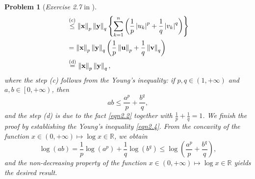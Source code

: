 \documentclass[11pt]{article}
\newtheorem{problem}{Problem}
\begin{document}
\begin{problem} [\emph{Exercise 2.7} in \cite{calafiore2014optimization}]
{\begin{equation}
\begin{split}
        &\stackrel{\textnormal{(c)}}{\leq} \left\| \mathbf{x} \right\|_p \left\| \mathbf{y} \right\|_q \left\{ \sum_{k=1}^{n} \left( \frac{1}{p} \left| u_k \right|^p + \frac{1}{q} \left| v_k \right|^q \right) \right\} \\
        &= \left\| \mathbf{x} \right\|_p \left\| \mathbf{y} \right\|_q \left( \frac{1}{p} \left\| \mathbf{u} \right\|_p + \frac{1}{q} \left\| \mathbf{v} \right\|_q \right) \\
        &\stackrel{\textnormal{(d)}}{=} \left\| \mathbf{x} \right\|_p \left\| \mathbf{y} \right\|_q,
    \end{split}
\end{equation}
where the step (c) follows from the Young's inequality: if $p, q \in \left( 1, +\infty \right)$ and $a, b \in \left[ 0, +\infty \right)$, then
\begin{equation}
    \label{eqn2.4}
    ab \leq \frac{a^p}{p} + \frac{b^q}{q},
\end{equation}
and the step (d) is due to the fact \eqref{eqn2.2} together with $\frac{1}{p} + \frac{1}{q} = 1$. We finish the proof by establishing the Young's inequality \eqref{eqn2.4}. From the concavity of the function $x \in \left( 0, +\infty \right) \mapsto \log x \in \mathbb{R}$, we obtain
\begin{equation*}
    \log (ab) = \frac{1}{p} \log \left( a^p \right) + \frac{1}{q} \log \left( b^q \right) \leq \log \left( \frac{a^p}{p} + \frac{b^q}{q} \right),
\end{equation*}
and the non-decreasing property of the function $x \in \left( 0, +\infty \right) \mapsto \log x \in \mathbb{R}$ yields the desired result.
}
\end{problem}
\end{document}
